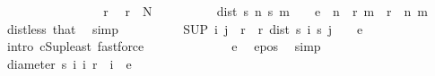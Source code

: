 \begin{isabellebody}
\ \ \ \ \ \ \isacommand{{\isacharbraceleft}{\kern0pt}}\isamarkupfalse%
\isanewline
\ \ \ \ \ \ \ \ \isamarkupfalse%
\ r\ \isamarkupfalse%
\ {\isachardoublequoteopen}r\ {\isasymge}\ N{\isachardoublequoteclose}\isanewline
\ \ \ \ \ \ \ \ \isamarkupfalse%
\ {\isachardoublequoteopen}dist\ {\isacharparenleft}{\kern0pt}s\ n{\isacharparenright}{\kern0pt}\ {\isacharparenleft}{\kern0pt}s\ m{\isacharparenright}{\kern0pt}\ {\isacharless}{\kern0pt}\ {\isacharparenleft}{\kern0pt}{}{\isacharslash}{\kern0pt}{}{\isacharparenright}{\kern0pt}\ {\isacharasterisk}{\kern0pt}\ e{\isachardoublequoteclose}\ \ {\isachardoublequoteopen}n\ {\isasymge}\ r{\isachardoublequoteclose}\ {\isachardoublequoteopen}m\ {\isasymge}\ r{\isachardoublequoteclose}\ \ n\ m\ \isamarkupfalse%
\ dist{\isacharunderscore}{\kern0pt}less\ that\ \isamarkupfalse%
\ simp\isanewline
\ \ \ \ \ \ \ \ \isamarkupfalse%
\ {\isachardoublequoteopen}{\isacharparenleft}{\kern0pt}SUP\ {\isacharparenleft}{\kern0pt}i{\isacharcomma}{\kern0pt}\ j{\isacharparenright}{\kern0pt}\ {\isasymin}\ {\isacharbraceleft}{\kern0pt}r{\isachardot}{\kern0pt}{\isachardot}{\kern0pt}{\isacharbraceright}{\kern0pt}\ {\isasymtimes}\ {\isacharbraceleft}{\kern0pt}r{\isachardot}{\kern0pt}{\isachardot}{\kern0pt}{\isacharbraceright}{\kern0pt}{\isachardot}{\kern0pt}\ dist\ {\isacharparenleft}{\kern0pt}s\ i{\isacharparenright}{\kern0pt}\ {\isacharparenleft}{\kern0pt}s\ j{\isacharparenright}{\kern0pt}{\isacharparenright}{\kern0pt}\ {\isasymle}\ {\isacharparenleft}{\kern0pt}{}{\isacharslash}{\kern0pt}{}{\isacharparenright}{\kern0pt}\ {\isacharasterisk}{\kern0pt}\ e{\isachardoublequoteclose}\ \isamarkupfalse%
\ {\isacharparenleft}{\kern0pt}intro\ cSup{\isacharunderscore}{\kern0pt}least{\isacharparenright}{\kern0pt}\ fastforce{\isacharplus}{\kern0pt}\isanewline
\ \ \ \ \ \ \ \ \isamarkupfalse%
\ \isamarkupfalse%
\ {\isachardoublequoteopen}{\isachardot}{\kern0pt}{\isachardot}{\kern0pt}{\isachardot}{\kern0pt}\ {\isacharless}{\kern0pt}\ e{\isachardoublequoteclose}\ \isamarkupfalse%
\ e{\isacharunderscore}{\kern0pt}pos\ \isamarkupfalse%
\ simp\isanewline
\ \ \ \ \ \ \ \ \isamarkupfalse%
\ \isamarkupfalse%
\ {\isachardoublequoteopen}diameter\ {\isacharbraceleft}{\kern0pt}s\ i\ {\isacharbar}{\kern0pt}i{\isachardot}{\kern0pt}\ r\ {\isasymle}\ i{\isacharbraceright}{\kern0pt}\ {\isacharless}{\kern0pt}\ e{\isachardoublequoteclose}\ \isamarkupfalse%

\end{isabellebody}
